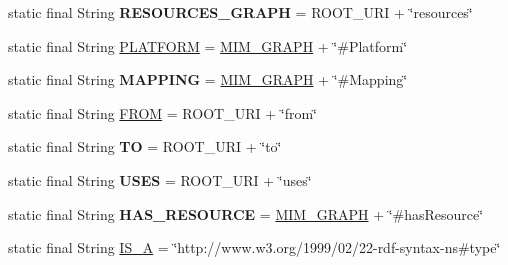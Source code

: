 \begin{DoxyCompactItemize}
\item 
static final String {\bfseries R\+E\+S\+O\+U\+R\+C\+E\+S\+\_\+\+G\+R\+A\+PH} = R\+O\+O\+T\+\_\+\+U\+RI + \char`\"{}resources\char`\"{}\hypertarget{classeu_1_1h2020_1_1symbiote_1_1ontology_1_1model_1_1Ontology_a48a2516bfdd39a219ef85cc5e78e266e}{}\label{classeu_1_1h2020_1_1symbiote_1_1ontology_1_1model_1_1Ontology_a48a2516bfdd39a219ef85cc5e78e266e}

\item 
static final String \hyperlink{classeu_1_1h2020_1_1symbiote_1_1ontology_1_1model_1_1Ontology_ac00eec92634db1932e091e2e6745805f}{P\+L\+A\+T\+F\+O\+RM} = \hyperlink{classeu_1_1h2020_1_1symbiote_1_1ontology_1_1model_1_1Ontology_abd334d1878740c80789fc2c6a9bf8afe}{M\+I\+M\+\_\+\+G\+R\+A\+PH} + \char`\"{}\#Platform\char`\"{}
\item 
static final String {\bfseries M\+A\+P\+P\+I\+NG} = \hyperlink{classeu_1_1h2020_1_1symbiote_1_1ontology_1_1model_1_1Ontology_abd334d1878740c80789fc2c6a9bf8afe}{M\+I\+M\+\_\+\+G\+R\+A\+PH} + \char`\"{}\#Mapping\char`\"{}\hypertarget{classeu_1_1h2020_1_1symbiote_1_1ontology_1_1model_1_1Ontology_ae898c53eac90471f4d1ca0e9015467f2}{}\label{classeu_1_1h2020_1_1symbiote_1_1ontology_1_1model_1_1Ontology_ae898c53eac90471f4d1ca0e9015467f2}

\item 
static final String \hyperlink{classeu_1_1h2020_1_1symbiote_1_1ontology_1_1model_1_1Ontology_a008ff7f8f4f0e447bb174cf41f8f46ab}{F\+R\+OM} = R\+O\+O\+T\+\_\+\+U\+RI + \char`\"{}from\char`\"{}
\item 
static final String {\bfseries TO} = R\+O\+O\+T\+\_\+\+U\+RI + \char`\"{}to\char`\"{}\hypertarget{classeu_1_1h2020_1_1symbiote_1_1ontology_1_1model_1_1Ontology_a0e1fb637b948224e7694c5a3bab3529f}{}\label{classeu_1_1h2020_1_1symbiote_1_1ontology_1_1model_1_1Ontology_a0e1fb637b948224e7694c5a3bab3529f}

\item 
static final String {\bfseries U\+S\+ES} = R\+O\+O\+T\+\_\+\+U\+RI + \char`\"{}uses\char`\"{}\hypertarget{classeu_1_1h2020_1_1symbiote_1_1ontology_1_1model_1_1Ontology_a253bb013a29228c06bd1b8560dba7ab9}{}\label{classeu_1_1h2020_1_1symbiote_1_1ontology_1_1model_1_1Ontology_a253bb013a29228c06bd1b8560dba7ab9}

\item 
static final String {\bfseries H\+A\+S\+\_\+\+R\+E\+S\+O\+U\+R\+CE} = \hyperlink{classeu_1_1h2020_1_1symbiote_1_1ontology_1_1model_1_1Ontology_abd334d1878740c80789fc2c6a9bf8afe}{M\+I\+M\+\_\+\+G\+R\+A\+PH} + \char`\"{}\#has\+Resource\char`\"{}\hypertarget{classeu_1_1h2020_1_1symbiote_1_1ontology_1_1model_1_1Ontology_ace5142a4fc4df48717b5fce0d630704c}{}\label{classeu_1_1h2020_1_1symbiote_1_1ontology_1_1model_1_1Ontology_ace5142a4fc4df48717b5fce0d630704c}

\item 
static final String \hyperlink{classeu_1_1h2020_1_1symbiote_1_1ontology_1_1model_1_1Ontology_a340a1b30309b46c4a13ca85efeae1309}{I\+S\+\_\+A} = \char`\"{}http\+://www.\+w3.\+org/1999/02/22-\/rdf-\/syntax-\/ns\#type\char`\"{}
\end{DoxyCompactItemize}


